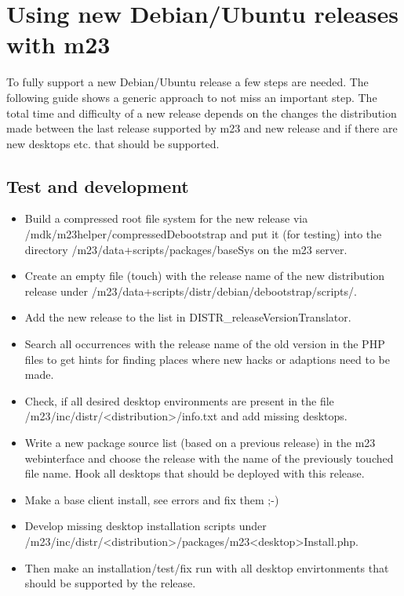 \section{Using new Debian/Ubuntu releases with m23}
To fully support a new Debian/Ubuntu release a few steps are needed. The following guide shows a generic approach to not miss an important step. The total time and difficulty of a new release depends on the changes the distribution made between the last release supported by m23 and new release and if there are new desktops etc. that should be supported.

\subsection{Test and development}
\begin{itemize}
\item Build a compressed root file system for the new release via /mdk/m23helper/compressedDebootstrap and put it (for testing) into the directory /m23/data+scripts/packages/baseSys on the m23 server.

\item Create an empty file (touch) with the release name of the new distribution release under /m23/data+scripts/distr/debian/debootstrap/scripts/.

\item Add the new release to the list in DISTR_releaseVersionTranslator.

\item Search all occurrences with the release name of the old version in the PHP files to get hints for finding places where new hacks or adaptions need to be made.

\item Check, if all desired desktop environments are present in the file /m23/inc/distr/<distribution>/info.txt and add missing desktops.

\item Write a new package source list (based on a previous release) in the m23 webinterface and choose the release with the name of the previously touched file name. Hook all desktops that should be deployed with this release.

\item Make a base client install, see errors and fix them ;-)

\item Develop missing desktop installation scripts under /m23/inc/distr/<distribution>/packages/m23<desktop>Install.php.

\item Then make an installation/test/fix run with all desktop envirtonments that should be supported by the release.
\end{itemize}



